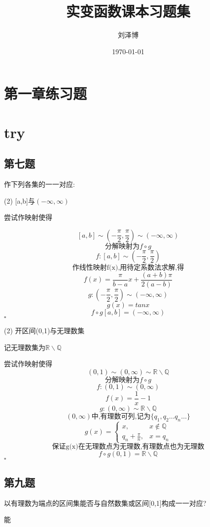 \documentclass[a4paper]{article}
\title{实变函数课本习题集}
\author{刘泽博}
\date{\today}
\begin{document}
    \maketitle
    \tableofcontents
    \section{第一章练习题}
    \section{try}
    \subsection{第七题}
    作下列各集的一一对应:

    (2) [a,b]与$(-\infty,\infty)$
    
    尝试作映射使得

    \[[a,b] \sim (-\frac{\pi}{2},\frac{\pi}{2}) \sim (-\infty,\infty)\]
    \[\text{分解映射为}f\circ g\]
    \[f:[a,b] \sim (-\frac{\pi}{2},\frac{\pi}{2})\]
    \[\text{作线性映射f(x),用待定系数法求解,得}\]
    \[f(x)=\frac{\pi}{b-a}x+\frac{(a+b)\pi}{2(a-b)}\]
    \[g:(-\frac{\pi}{2},\frac{\pi}{2}) \sim (-\infty,\infty)\]
    \[g(x)=tanx\]
    \[f\circ g [a,b] =(-\infty,\infty)\]
    \hfill $\square$

    (2) 开区间(0,1)与无理数集

    记无理数集为$\mathbb{R}\backslash\mathbb{Q}$

    尝试作映射使得
    \[(0,1) \sim (0,\infty) \sim \mathbb{R}\backslash\mathbb{Q}\]
    \[\text{分解映射为}f\circ g\]
    \[f:(0,1) \sim (0,\infty)\]
    \[f(x)=\frac{1}{x}-1\]
    \[g:(0,\infty) \sim \mathbb{R}\backslash\mathbb{Q}\]
    \[(0,\infty)\text{中,有理数可列,记为} \{q_1,q_2\ldots q_n \ldots\}\]
    \[
    g(x) =
    \begin{cases}
    x, & x \not\in \mathbb{Q} \\
    q_n+\frac{\pi}{n}, & x = q_n
    \end{cases}
    \]
    \[\text{保证g(x)在无理数点为无理数,有理数点也为无理数}\]
    \[f\circ g (0,1)= \mathbb{R}\backslash\mathbb{Q}\]
    \hfill $\square$

    \subsection{第九题}
    以有理数为端点的区间集能否与自然数集或区间[0,1]构成一一对应?

    能
\end{document}
